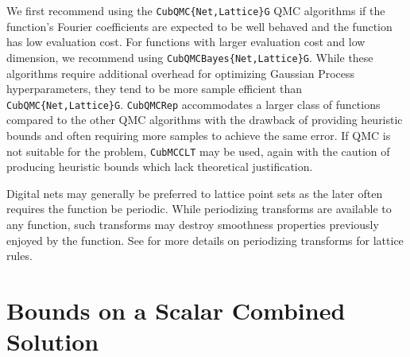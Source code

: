 \documentclass[graybox]{svmult}
\begin{document}
We first recommend using the  \texttt{CubQMC\{Net,Lattice\}G} QMC algorithms if the function's Fourier coefficients are expected to be well behaved and the function has low evaluation cost. For functions with larger evaluation cost and low dimension, we recommend using  \texttt{CubQMCBayes\{Net,Lattice\}G}. While these algorithms require additional overhead for optimizing Gaussian Process hyperparameters, they tend to be more sample efficient than \texttt{CubQMC\{Net,Lattice\}G}. \texttt{CubQMCRep} accommodates a larger class of functions compared to the other QMC algorithms with the drawback of providing heuristic bounds and often requiring more samples to achieve the same error. If QMC is not suitable for the problem, \texttt{CubMCCLT} may be used, again with the caution of producing heuristic bounds which lack theoretical justification.

Digital nets may generally be preferred to lattice point sets as the later often requires the function be periodic. While periodizing transforms are available to any function, such transforms may destroy smoothness properties previously enjoyed by the function. See \cite[Chapter 16]{mcbook} for more details on periodizing transforms for lattice rules.

\section{Bounds on a Scalar Combined Solution} \label{sec:comb_sol_approx}
\end{document}

